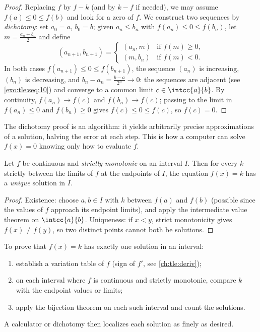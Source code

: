 \begin{proof}
Replacing $f$ by $f - k$ (and by $k - f$ if needed), we may assume
$f(a) \leq 0 \leq f(b)$ and look for a zero of $f$. We construct two
sequences by \emph{dichotomy}: set $a_0 = a$, $b_0 = b$;
given $a_n \leq b_n$ with $f(a_n) \leq 0 \leq f(b_n)$, let
$m = \frac{a_n + b_n}{2}$ and define
\[
(a_{n+1}, b_{n+1}) =
\begin{cases}
(a_n, m) & \text{if } f(m) \geq 0,\\
(m, b_n) & \text{if } f(m) < 0.
\end{cases}
\]
In both cases $f(a_{n+1}) \leq 0 \leq f(b_{n+1})$, the sequence $(a_n)$ is
increasing, $(b_n)$ is decreasing, and
$b_n - a_n = \frac{b-a}{2^n} \to 0$: the sequences are adjacent (see
\cref{exo:tle:seq:10}) and converge to a common limit
$c \in \intcc{a}{b}$. By continuity, $f(a_n) \to f(c)$ and
$f(b_n) \to f(c)$; passing to the limit in $f(a_n) \leq 0$ and
$f(b_n) \geq 0$ gives $f(c) \leq 0 \leq f(c)$, so $f(c) = 0$.
\end{proof}

\begin{remark}
The dichotomy proof is an algorithm: it yields arbitrarily precise
approximations of a solution, halving the error at each step. This is how a
computer can solve $f(x) = 0$ knowing only how to evaluate $f$.
\end{remark}

\begin{theorem}\label{thm:tle:limcont:bijection}
Let $f$ be continuous and \emph{strictly monotonic} on an interval $I$. Then
for every $k$ strictly between the limits of $f$ at the endpoints of $I$, the
equation $f(x) = k$ has a \emph{unique} solution in $I$.
\end{theorem}

\begin{proof}
Existence: choose $a, b \in I$ with $k$ between $f(a)$ and $f(b)$ (possible
since the values of $f$ approach its endpoint limits), and apply the
intermediate value theorem on $\intcc{a}{b}$. Uniqueness: if $x < y$, strict
monotonicity gives $f(x) \neq f(y)$, so two distinct points cannot both be
solutions.
\end{proof}

\begin{method}[Solving $f(x) = k$ with the bijection theorem]\label{met:tle:limcont:bijection}
To prove that $f(x) = k$ has exactly one solution in an interval:
\begin{enumerate}
  \item establish a variation table of $f$ (sign of $f'$, see
        \cref{ch:tle:deriv});
  \item on each interval where $f$ is continuous and strictly monotonic,
        compare $k$ with the endpoint values or limits;
  \item apply the bijection theorem on each such interval and count the
        solutions.
\end{enumerate}
A calculator or dichotomy then localizes each solution as finely as desired.
\end{method}

